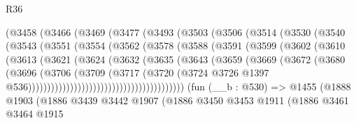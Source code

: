 \begin{lexlean}{R36}
\begin{coremodule}
              (@3458
                (@3466
                  (@3469
                    (@3477
                      (@3493
                        (@3503
                          (@3506
                            (@3514
                              (@3530
                                (@3540
                                  (@3543
                                    (@3551
                                      (@3554
                                        (@3562
                                          (@3578
                                            (@3588
                                              (@3591
                                                (@3599
                                                  (@3602
                                                    (@3610
                                                      (@3613
                                                        (@3621
                                                          (@3624
                                                            (@3632
                                                              (@3635
                                                                (@3643
                                                                  (@3659
                                                                    (@3669
                                                                      (@3672
                                                                        (@3680
                                                                          (@3696
                                                                            (@3706
                                                                              (@3709
                                                                                (@3717
                                                                                  (@3720
                                                                                    (@3724
                                                                                      @3726
                                                                                      @1397
                                                                                      @536)))))))))))))))))))))))))))))))))))))))))
    (fun (__b : @530) =>
    @1455
      (@1888
        @1903
        (@1886
          @3439
          @3442
          @1907
          (@1886
            @3450
            @3453
            @1911
            (@1886
              @3461
              @3464
              @1915

\end{coremodule}
\end{lexlean}
